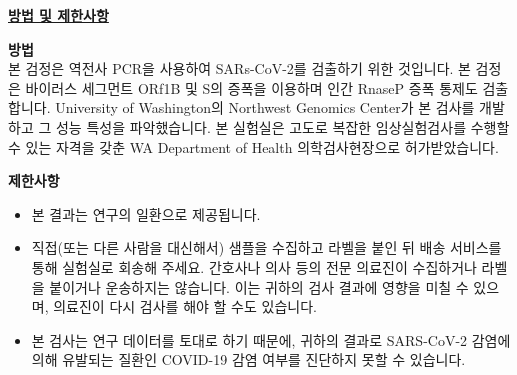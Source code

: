 \documentclass[10pt]{article}
\begin{document}
\large \underline{\textbf{방법 및 제한사항}}

\textbf{방법}\\
본 검정은 역전사 PCR을 사용하여 SARs-CoV-2를 검출하기 위한 것입니다. 본 검정은 바이러스 세그먼트
ORf1B 및 S의 증폭을 이용하며 인간 RnaseP 증폭 통제도 검출합니다. University of
Washington의 Northwest Genomics Center가 본 검사를 개발하고 그 성능 특성을 파악했습니다.
본 실험실은 고도로 복잡한 임상실험검사를 수행할 수 있는 자격을 갖춘 WA Department of Health
의학검사현장으로 허가받았습니다.

\textbf{제한사항}

\begin{itemize}

\item

  본 결과는 연구의 일환으로 제공됩니다.

\item

  직접(또는 다른 사람을 대신해서) 샘플을 수집하고 라벨을 붙인 뒤 배송 서비스를 통해 실험실로 회송해
  주세요. 간호사나 의사 등의 전문 의료진이 수집하거나 라벨을 붙이거나 운송하지는 않습니다. 이는
  귀하의 검사 결과에 영향을 미칠 수 있으며, 의료진이 다시 검사를 해야 할 수도 있습니다.

\item

  본 검사는 연구 데이터를 토대로 하기 때문에, 귀하의 결과로 SARS-CoV-2 감염에 의해 유발되는
  질환인 COVID-19 감염 여부를 진단하지 못할 수 있습니다.

\end{itemize}
\end{document}
